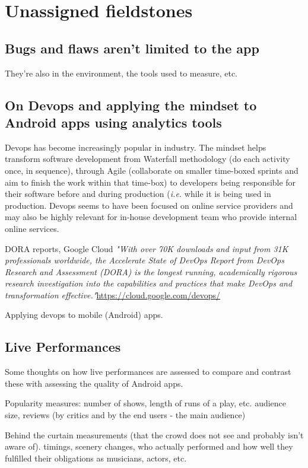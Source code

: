 \chapter{Unassigned fieldstones}

\section{Bugs and flaws aren't limited to the app}
They're also in the environment, the tools used to measure, etc.


\section{On Devops and applying the mindset to Android apps using analytics tools}

Devops has become increasingly popular in industry. The mindset helps transform software development from Waterfall methodology (do each activity once, in sequence), through Agile (collaborate on smaller time-boxed sprints and aim to finish the work within that time-box) to developers being responsible for their software before and during production (\emph{i.e.} while it is being used in production. Devops seems to have been focused on online service providers and may also be highly relevant for in-house development team who provide internal online services.

DORA reports, Google Cloud \emph{"With over 70K downloads and input from 31K professionals worldwide, the Accelerate State of DevOps Report from DevOps Research and Assessment (DORA) is the longest running, academically rigorous research investigation into the capabilities and practices that make DevOps and transformation effective."}\url{https://cloud.google.com/devops/}

Applying devops to mobile (Android) apps. 

\section{Live Performances}
Some thoughts on how live performances are assessed to compare and contrast these with assessing the quality of Android apps.

Popularity measures: number of shows, length of runs of a play, etc. audience size, reviews (by critics and by the end users - the main audience) 

Behind the curtain measurements (that the crowd does not see and probably isn't aware of). timings, scenery changes, who actually performed and how well they fulfilled their obligations as musicians, actors, etc.

